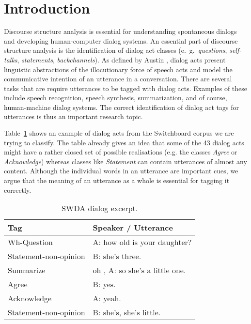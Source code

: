 \section{Introduction}\label{sec:intro}
Discourse structure analysis is essential for understanding spontaneous dialogs and developing human-computer dialog systems.
An essential part of discourse structure analysis is the identification of dialog act classes (e.\ g.\ \emph{questions}, \emph{self-talks}, \emph{statements}, \emph{backchannels}).
As defined by Austin , dialog acts present linguistic abstractions of the illocutionary force of speech acts and model the communicative intention of an utterance in a conversation.
There are several tasks that are require utterances to be tagged with dialog acts.
Examples of these include speech recognition, speech synthesis, summarization, and of course, human-machine dialog systems.
The correct identification of dialog act tags for utterances is thus an important research topic.


Table~\ref{tab:swda_example} shows an example of dialog acts from the Switchboard corpus we are trying to classify.
The table already gives an idea that some of the 43 dialog acts might have a rather closed set of possible realisations (e.g. the classes \emph{Agree} or \emph{Acknowledge}) whereas classes like \emph{Statement} can contain utterances of almost any content.
Although the individual words in an utterance are important cues, we argue that the meaning of an utterance as a whole is essential for tagging it correctly.



\begin{table}[h]
\centering
\small
\begin{tabular}{ll}
\hline
\textbf{Tag} & \textbf{Speaker / Utterance}
\\
\hline
Wh-Question & A: how old is your daughter?\\
Statement-non-opinion & B: she's three.\\
Summarize & oh , A: so she's a little one.\\
Agree & B: yes.\\
Acknowledge & A: yeah.\\
Statement-non-opinion & B: she's, she's little.\\
\hline
\end{tabular}
\caption{SWDA dialog excerpt.}
\label{tab:swda_example}
\end{table}

